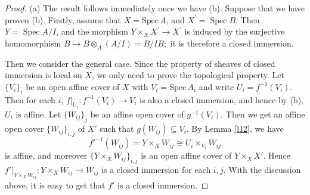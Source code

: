 \documentclass[12pt]{amsart}
\begin{document}
\begin{proof}
	(a) The result follows immediately once we have (b). Suppose that we have proven (b). Firstly, assume that $X=\mathrm{Spec}\, A$, and $X^{\prime}=\operatorname{Spec} B$. Then $Y=\operatorname{Spec} A / I$, and the morphism $Y \times_{X} X^{\prime} \rightarrow X^{\prime}$ is
	induced by the surjective homomorphism $B \rightarrow B \otimes_{A} (A / I)=B / I B ;$ it is therefore a closed immersion. 
	
	Then we consider the general case. Since the property of sheaves of closed immersion is local on $X$, we only need to prove the topological property. Let $\{V_i\}_i$ be an open affine cover of $X$ with $V_i=\mathrm{Spec}\,A_i$ and write $U_i=f^{-1}(V_i)$. Then for each $i$, $f|_{U_i}:f^{-1}(V_i)\to V_i$ is also a closed immersion, and hence by (b), $U_i$ is affine. Let $\{W_{ij}\}_j$ be an affine open cover of $g^{-1}(V_i)$. Then we get an affine open cover $\{W_{ij}\}_{i,j}$ of $X'$ such that $g(W_{ij})\subseteq V_i$. By Lemma \ref{l12}, we have$$f'^{-1}(W_{ij})=Y\times_XW_{ij}\cong U_i\times_{V_i}W_{ij}$$is affine, and moreover $\{Y\times_XW_{ij}\}_{i,j}$ is an open affine cover of $Y\times_XX'$. Hence $f'|_{Y\times_XW_{ij}}:Y\times_XW_{ij}\to W_{ij}$ is a closed immersion for each $i,j$. With the discussion above, it is easy to get that $f'$ is a closed immersion.
	

\end{proof}
\end{document}
